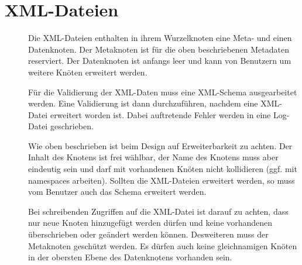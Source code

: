 \section{XML-Dateien} \label{spec:xml}
\begin{description}
	\item []
		Die XML-Dateien enthalten in ihrem Wurzelknoten eine Meta- und einen Datenknoten.
		Der Metaknoten ist für die oben beschriebenen Metadaten reserviert.
		Der Datenknoten ist anfangs leer und kann von Benutzern um weitere Knöten erweitert werden.
	\item []
		Für die Validierung der XML-Daten muss eine XML-Schema ausgearbeitet werden.
		Eine Validierung ist dann durchzuführen, nachdem eine XML-Datei erweitert worden ist.
		Dabei auftretende Fehler werden in eine Log-Datei geschrieben.
	\item []
		Wie oben beschrieben ist beim Design auf Erweiterbarkeit zu achten.
		Der Inhalt des Knotens ist frei wählbar, der Name des Knotens muss aber
		eindeutig sein und darf mit vorhandenen Knöten nicht kollidieren
		(ggf. mit namespaces arbeiten).
		Sollten die XML-Dateien erweitert werden, so muss vom Benutzer auch das Schema erweitert werden.
	\item []
		Bei schreibenden Zugriffen auf die XML-Datei ist darauf zu achten, 
		dass nur neue Knoten hinzugefügt werden dürfen und
		keine vorhandenen überschrieben oder geändert werden können.
		Desweiteren muss der Metaknoten geschützt werden.
		Es dürfen auch keine gleichnamigen Knöten in der obersten Ebene des Datenknotens
		vorhanden sein.
\end{description}
	

